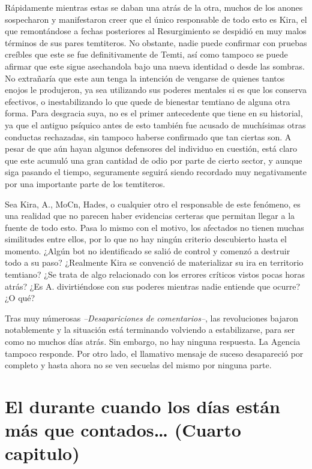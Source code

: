 \documentclass[
  spanish,
]{book}
\begin{document}
Rápidamente mientras estas se daban una atrás de la otra, muchos de los anones sospecharon y manifestaron creer que el único responsable de todo esto es Kira, el que remontándose a fechas posteriores al Resurgimiento se despidió en muy malos términos de sus pares temtiteros. No obstante, nadie puede confirmar con pruebas creíbles que este se fue definitivamente de Temti, así como tampoco se puede afirmar que este sigue asechandola bajo una nueva identidad o desde las sombras.
No extrañaría que este aun tenga la intención de vengarse de quienes tantos enojos le produjeron, ya sea utilizando sus poderes mentales si es que los conserva efectivos, o inestabilizando lo que quede de bienestar temtiano de alguna otra forma. Para desgracia suya, no es el primer antecedente que tiene en su historial, ya que el antiguo psíquico antes de esto también fue acusado de muchísimas otras conductas rechazadas, sin tampoco haberse confirmado que tan ciertas son.
A pesar de que aún hayan algunos defensores del individuo en cuestión, está claro que este acumuló una gran cantidad de odio por parte de cierto sector, y aunque siga pasando el tiempo, seguramente seguirá siendo recordado muy negativamente por una importante parte de los temtiteros.

Sea Kira, A., MoCn, Hades, o cualquier otro el responsable de este fenómeno, es una realidad que no parecen haber evidencias certeras que permitan llegar a la fuente de todo esto. Pasa lo mismo con el motivo, los afectados no tienen muchas similitudes entre ellos, por lo que no hay ningún criterio descubierto hasta el momento. ¿Algún bot no identificado se salió de control y comenzó a destruir todo a su paso? ¿Realmente Kira se convenció de materializar su ira en territorio temtiano? ¿Se trata de algo relacionado con los errores críticos vistos pocas horas atrás? ¿Es A. divirtiéndose con sus poderes mientras nadie entiende que ocurre? ¿O qué?

Tras muy númerosas \emph{--Desapariciones de comentarios--}, las revoluciones bajaron notablemente y la situación está terminando volviendo a estabilizarse, para ser como no muchos días atrás. Sin embargo, no hay ninguna respuesta. La Agencia tampoco responde.
Por otro lado, el llamativo mensaje de suceso desapareció por completo y hasta ahora no se ven secuelas del mismo por ninguna parte.

\hypertarget{el-durante-cuando-los-duxedas-estuxe1n-muxe1s-que-contados-cuarto-capitulo}{%
\chapter{El durante cuando los días están más que contados\ldots{} (Cuarto capitulo)}\label{el-durante-cuando-los-duxedas-estuxe1n-muxe1s-que-contados-cuarto-capitulo}}
\end{document}
